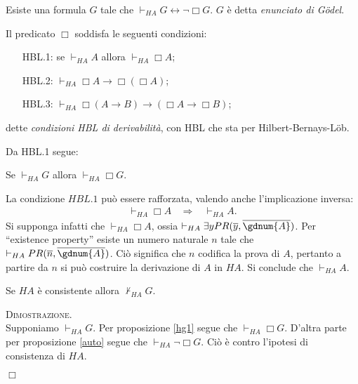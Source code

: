 	\begin{prop}
	\label{auto}
	Esiste una formula $G$ tale che $\vdash_{HA} G \leftrightarrow\neg\Box G$.
	$G$ \`e detta \textit{enunciato di G\"odel}.
	\end{prop}

	\begin{thm} Il predicato $\Box$ soddisfa le seguenti condizioni:

	\begin{itemize}
 	\item[\small{HBL.1}:] se $\vdash_{HA}A$ allora $\vdash_{HA}\Box A$;
 	\item[\small{HBL.2}:] $\vdash_{HA} \Box A\rightarrow \Box(\Box A)$;
 	\item[\small{HBL.3}:] $\vdash_{HA} \Box(A\rightarrow B)
 	\rightarrow (\Box A\rightarrow \Box B)$;
	\end{itemize}
	dette \textit{condizioni HBL di derivabilit\`a}, con HBL che
	sta per Hilbert-Bernays-L\"ob.
	\end{thm}

	Da HBL.1 segue:

	\begin{prop}
	\label{hg1}Se $\vdash_{HA} G$ allora $\vdash_{HA}\Box G$.
	\end{prop}

	\begin{oss}
	\label{oss:HBL}
	La condizione $HBL.1$ pu\`o essere rafforzata, valendo anche l'implicazione inversa:
	\begin{eqnarray}
	\vdash_{HA}\Box A\:\:\:\:\Rightarrow\:\:\:\:\vdash_{HA} A.\nonumber
	\end{eqnarray}
	Si supponga infatti che $\vdash_{HA}\Box A$, ossia $\vdash_{HA}\exists
	yPR(\overline{y},\overline{\gdnum{A}})$.
	Per ``existence property''  esiste un numero naturale $n$ tale
	che $\vdash_{HA} PR(\overline{n},\overline{\gdnum{A}})$.
	Ci\`o significa che $n$ codifica la prova di $A$, pertanto a
	partire da $n$ si pu\`o costruire la derivazione di $A$ in $HA$.
	Si conclude che $\vdash_{HA} A$.
	\end{oss}

	\begin{thm}
	\label{teo:nonG}
	Se $HA$ \`e consistente allora $\not\vdash_{HA} G$.
	\end{thm}

	\textsc{Dimostrazione.}\\
	Supponiamo $\vdash_{HA} G$. Per proposizione \ref{hg1}
	segue che $\vdash_{HA}\Box G$.
	D'altra parte per proposizione \ref{auto} segue che
	$\vdash_{HA}\neg\Box G$. Ci\`o \`e 
	contro l'ipotesi di consistenza di $HA$.
	\begin{flushright}$\Box$\end{flushright}

